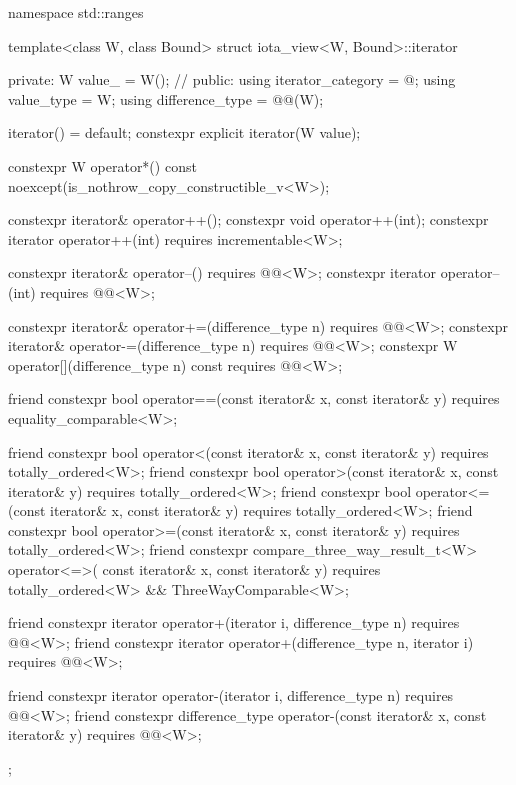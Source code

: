 \begin{codeblock}
namespace std::ranges {
  template<class W, class Bound>
  struct iota_view<W, Bound>::iterator {
  private:
    W value_ = W();             // \expos
  public:
    using iterator_category = @\seebelow@;
    using value_type = W;
    using difference_type = @@(W);

    iterator() = default;
    constexpr explicit iterator(W value);

    constexpr W operator*() const noexcept(is_nothrow_copy_constructible_v<W>);

    constexpr iterator& operator++();
    constexpr void operator++(int);
    constexpr iterator operator++(int) requires incrementable<W>;

    constexpr iterator& operator--() requires @@<W>;
    constexpr iterator operator--(int) requires @@<W>;

    constexpr iterator& operator+=(difference_type n)
      requires @@<W>;
    constexpr iterator& operator-=(difference_type n)
      requires @@<W>;
    constexpr W operator[](difference_type n) const
      requires @@<W>;

    friend constexpr bool operator==(const iterator& x, const iterator& y)
      requires equality_comparable<W>;

    friend constexpr bool operator<(const iterator& x, const iterator& y)
      requires totally_ordered<W>;
    friend constexpr bool operator>(const iterator& x, const iterator& y)
      requires totally_ordered<W>;
    friend constexpr bool operator<=(const iterator& x, const iterator& y)
      requires totally_ordered<W>;
    friend constexpr bool operator>=(const iterator& x, const iterator& y)
      requires totally_ordered<W>;
    friend constexpr compare_three_way_result_t<W> operator<=>(
        const iterator& x, const iterator& y)
      requires totally_ordered<W> && ThreeWayComparable<W>;

    friend constexpr iterator operator+(iterator i, difference_type n)
      requires @@<W>;
    friend constexpr iterator operator+(difference_type n, iterator i)
      requires @@<W>;

    friend constexpr iterator operator-(iterator i, difference_type n)
      requires @@<W>;
    friend constexpr difference_type operator-(const iterator& x, const iterator& y)
      requires @@<W>;
  };
}
\end{codeblock}

